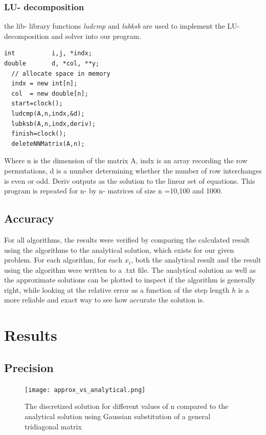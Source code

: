 \documentclass[10pt,a4paper]{article}
\begin{document}
\subsubsection{LU- decomposition}

the lib- library functions \emph{ludcmp} and  \emph{lubksb} are used to implement the LU- decomposition and solver into our program.
\begin{lstlisting}[caption=Calling the inbuilt lib.cpp functions "ludcmp" and "lubksb" on the matrix A]
int          i,j, *indx;
double       d, *col, **y;
  // allocate space in memory
  indx = new int[n];
  col  = new double[n];
  start=clock();
  ludcmp(A,n,indx,&d);
  lubksb(A,n,indx,deriv);
  finish=clock();
  deleteNNMatrix(A,n);
\end{lstlisting}
Where n is the dimension of the matrix A, indx is an array recording the row permutations, d is a number determining whether the number of row interchanges is even or odd. Deriv outputs as the solution to the linear set of equations. This program is repeated for n- by n- matrices of size n =10,100 and 1000.

\subsection{Accuracy}
For all algorithms, the results were verified by comparing the calculated result using the algorithms to the analytical solution, which exists for our given problem. For each algorithm, for each $x_i$, both the analytical result and the result using the algorithm were written to a .txt file. The analytical solution as well as the approximate solutions can be plotted to inspect if the algorithm is generally right, while looking at the relative error as a function of the step length $h$ is a more reliable and exact way to see how accurate the solution is. 
\section{Results}

\subsection{Precision}

\begin{figure}[H]
	\texttt{[image: approx\_vs\_analytical.png]}
	\caption[Precision of the generalized algorithm]{The discretized solution for different values of n compared to the analytical solution using Gaussian substitution of a general tridiagonal matrix}
\end{figure}
\end{document}
